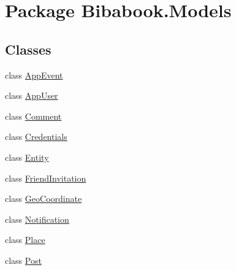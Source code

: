 \hypertarget{namespace_bibabook_1_1_models}{}\section{Package Bibabook.\+Models}
\label{namespace_bibabook_1_1_models}
\subsection*{Classes}
\begin{DoxyCompactItemize}
\item 
class \hyperlink{class_bibabook_1_1_models_1_1_app_event}{App\+Event}
\item 
class \hyperlink{class_bibabook_1_1_models_1_1_app_user}{App\+User}
\item 
class \hyperlink{class_bibabook_1_1_models_1_1_comment}{Comment}
\item 
class \hyperlink{class_bibabook_1_1_models_1_1_credentials}{Credentials}
\item 
class \hyperlink{class_bibabook_1_1_models_1_1_entity}{Entity}
\item 
class \hyperlink{class_bibabook_1_1_models_1_1_friend_invitation}{Friend\+Invitation}
\item 
class \hyperlink{class_bibabook_1_1_models_1_1_geo_coordinate}{Geo\+Coordinate}
\item 
class \hyperlink{class_bibabook_1_1_models_1_1_notification}{Notification}
\item 
class \hyperlink{class_bibabook_1_1_models_1_1_place}{Place}
\item 
class \hyperlink{class_bibabook_1_1_models_1_1_post}{Post}
\end{DoxyCompactItemize}
